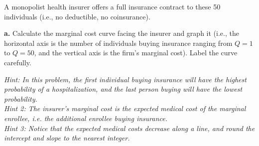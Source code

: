 \documentclass[12pt]{article}
\begin{document}
A monopolist health insurer offers a full insurance contract to these 50 individuals
(i.e., no deductible, no coinsurance).

\bigskip
\noindent\textbf{a.} Calculate the marginal cost curve facing the insurer and graph it
(i.e., the horizontal axis is the number of individuals buying insurance ranging from $Q=1$ to $Q=50$,
and the vertical axis is the firm's marginal cost). Label the curve carefully.

\medskip
\textit{Hint: In this problem, the first individual buying insurance will have the highest probability of a hospitalization,
and the last person buying will have the lowest probability.}\\
\textit{Hint 2: The insurer's marginal cost is the expected medical cost of the marginal enrollee, i.e. the additional enrollee buying insurance.}\\
\textit{Hint 3: Notice that the expected medical costs decrease along a line, and round the intercept and slope to the nearest integer.}
\end{document}
